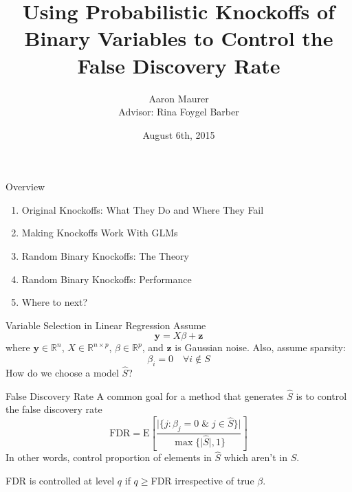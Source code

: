 \documentclass{beamer}
\title{Using Probabilistic Knockoffs of Binary Variables to Control the False Discovery Rate}
\author{Aaron Maurer \\ Advisor: Rina Foygel Barber}
\date{August 6th, 2015}
\newcommand{\R}{\mathbb{R}}
\newcommand{\E}{\mathrm{E}}
\begin{document}
\begin{frame}[plain]
    \titlepage
\end{frame}

\begin{frame}{Overview}
    \begin{enumerate} 
        \item Original Knockoffs: What They Do and Where They Fail
        \item Making Knockoffs Work With GLMs
        \item Random Binary Knockoffs: The Theory
        \item Random Binary Knockoffs: Performance
        \item Where to next?
    \end{enumerate}
\end{frame}

\begin{frame}{Variable Selection in Linear Regression}
    Assume
     \[\mathbf{y} = X\beta + \mathbf{z}\]
    where $\mathbf{y}\in\R^n$, $X \in \R^{n\times p}$, $\beta\in\R^p$, and $\mathbf z$ is Gaussian noise. Also, assume sparsity:
    \[\beta_i = 0 \quad \forall i\not\in S\]
    How do we choose a model $\hat S$?
\end{frame}

\begin{frame}{False Discovery Rate}
    A common goal for a method that generates $\hat S$ is to control the false discovery rate
    \[ \textrm{FDR} = \E\left[\frac{\vert{\{j: \beta_j=0 \; \& \; j\in\hat S\}}\vert}{\max\{\vert{\hat S}\vert,1\}} \right] \]
    In other words, control proportion of elements in $\hat S$ which aren't in $S$. \par
    \vspace{1cm}
    FDR is controlled at level $q$ if $q\geq$FDR irrespective of true $\beta$.
    
\end{frame}
\end{document}
